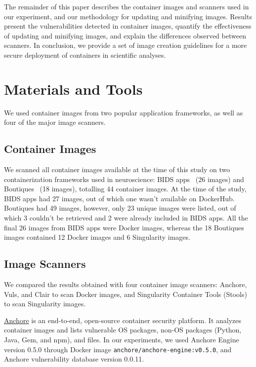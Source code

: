 \documentclass[a4paper,num-refs]{oup-contemporary}
\newcommand{\revision}[1]{\color{ao(english)}#1\color{black}\xspace}
\begin{document}
The remainder of this paper 
describes the container images and scanners used in our experiment, and our methodology for updating and minifying images.
Results present the vulnerabilities detected in container
images, quantify the effectiveness of updating and minifying images, and
explain the differences observed between scanners. In conclusion, we
provide a set of image creation guidelines for a more secure deployment of
containers \revision{in scientific analyses}.

\section{Materials and Tools}

We used container
images from two popular application frameworks, as well as
four of the major image scanners.

\subsection{Container Images}

We scanned all container images available at the time of this study on two containerization frameworks
used in neuroscience: BIDS
apps~\cite{gorgolewski2017bids} (26 images) and Boutiques~\cite{glatard2018boutiques} (18 images),
totalling
44 container images. At the time of the study, BIDS apps had 27 images,
out of which one wasn't available on DockerHub. Boutiques had 49 images,
however, only 23 unique images were listed, out of which 3 couldn't be retrieved and 2
were already included in BIDS apps. All the final 26 images
from BIDS apps were Docker images, whereas the 18 Boutiques images contained 12 Docker images
and 6 Singularity images.

\subsection{Image Scanners}

We compared the results obtained with four container image scanners: Anchore, Vuls, and
Clair to scan Docker images, and Singularity Container Tools
(Stools) to scan Singularity images. 

\href{https://github.com/anchore/anchore-engine}{Anchore} is an end-to-end, open-source container security platform. It
analyzes container images and lists vulnerable OS
packages, non-OS packages (Python, Java, Gem, and npm), and files.
In our experiments, we used Anchore Engine version 0.5.0 through Docker image \texttt{anchore/anchore-engine:v0.5.0}, and
Anchore vulnerability database version 0.0.11.
\end{document}
